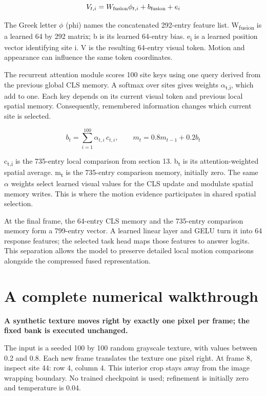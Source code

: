 \documentclass[11pt,letterpaper]{article}
\begin{document}
\begin{equation}V_{t,i}=W_{\rm fusion}\phi_{t,i}+b_{\rm fusion}+e_i\end{equation}

The Greek letter \(\phi\) (phi) names the concatenated 292-entry feature list. W\textsubscript{fusion} is a learned 64 by 292 matrix; b is its learned 64-entry bias. e\textsubscript{i} is a learned position vector identifying site i. V is the resulting 64-entry visual token. Motion and appearance can influence the same token coordinates.


The recurrent attention module scores 100 site keys using one query derived from the previous global CLS memory. A softmax over sites gives weights \(\alpha\)\textsubscript{t,i}, which add to one. Each key depends on its current visual token and previous local spatial memory. Consequently, remembered information changes which current site is selected.


\begin{equation}b_t=\sum_{i=1}^{100}\alpha_{t,i}\,c_{t,i},\qquad m_t=0.8m_{t-1}+0.2b_t\end{equation}

c\textsubscript{t,i} is the 735-entry local comparison from section 13. b\textsubscript{t} is its attention-weighted spatial average. m\textsubscript{t} is the 735-entry comparison memory, initially zero. The same \(\alpha\) weights select learned visual values for the CLS update and modulate spatial memory writes. This is where the motion evidence participates in shared spatial selection.


At the final frame, the 64-entry CLS memory and the 735-entry comparison memory form a 799-entry vector. A learned linear layer and GELU turn it into 64 response features; the selected task head maps those features to answer logits. This separation allows the model to preserve detailed local motion comparisons alongside the compressed fused representation.


\clearpage

\section{A complete numerical walkthrough}\label{sec15}

\textbf{A synthetic texture moves right by exactly one pixel per frame; the fixed bank is executed unchanged.}


The input is a seeded 100 by 100 random grayscale texture, with values between 0.2 and 0.8. Each new frame translates the texture one pixel right. At frame 8, inspect site 44: row 4, column 4. This interior crop stays away from the image wrapping boundary. No trained checkpoint is used; refinement is initially zero and temperature is 0.04.
\end{document}
